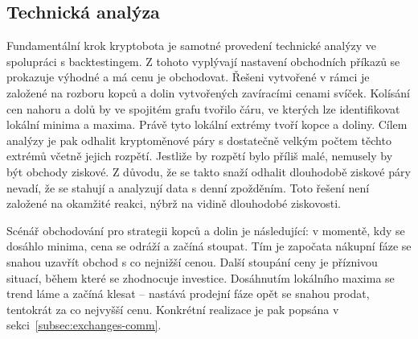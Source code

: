 \subsection{Technická analýza}
Fundamentální krok kryptobota je samotné provedení technické analýzy ve spolupráci s backtestingem. Z tohoto vyplývají nastavení obchodních příkazů se prokazuje výhodné
a má cenu je obchodovat. Řešeni vytvořené v rámci je založené na rozboru kopců a dolin vytvořených zavíracími cenami svíček. Kolísání cen nahoru a dolů by ve spojitém grafu
tvořilo čáru, ve kterých lze identifikovat lokální minima a maxima. Právě tyto lokální extrémy tvoří kopce a doliny. Cílem analýzy je pak odhalit kryptoměnové páry s dostatečně
velkým počtem těchto extrémů včetně jejich rozpětí. Jestliže by rozpětí bylo příliš malé, nemusely by být obchody ziskové. Z důvodu, že se takto snaží odhalit dlouhodobě
ziskové páry nevadí, že se stahují a analyzují data s denní zpožděním. Toto řešení není založené na okamžité reakci, nýbrž na vidině dlouhodobé ziskovosti.

Scénář obchodování pro strategii kopců a dolin je následující: v momentě, kdy se dosáhlo minima, cena se odráží a začíná stoupat. Tím je započata nákupní fáze
se snahou uzavřít obchod s co nejnižší cenou. Další stoupání ceny je příznivou situací, během které se zhodnocuje investice. Dosáhnutím lokálního maxima se trend láme a začíná klesat
-- nastává prodejní fáze opět se snahou prodat, tentokrát za co nejvyšší cenu. Konkrétní realizace je pak popsána v sekci~\ref{subsec:exchanges-comm}.



